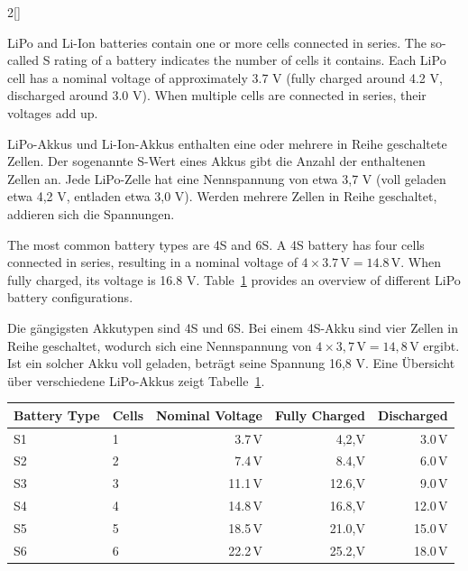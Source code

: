 \begin{paracol}{2}[]
\colende

\renewcommand{\deutschertitel}{Anzahl der Zellen (S4/S6)}
\renewcommand{\englischertitel}{Number of Cells (S4/S6)}
\makrounterabschnitt
\label{AbschnittSWertAkkusZellen}

LiPo and Li-Ion batteries contain one or more cells connected in series. The so-called S rating of a battery indicates the number of cells it contains. Each LiPo cell has a nominal voltage of approximately 3.7 V (fully charged around 4.2 V, discharged around 3.0 V). When multiple cells are connected in series, their voltages add up.

\colger

LiPo-Akkus und Li-Ion-Akkus enthalten eine oder mehrere in Reihe geschaltete Zellen. Der sogenannte S-Wert eines Akkus gibt die Anzahl der enthaltenen Zellen an. Jede LiPo-Zelle hat eine Nennspannung von etwa 3,7 V (voll geladen etwa 4,2 V, entladen etwa 3,0 V). Werden mehrere Zellen in Reihe geschaltet, addieren sich die Spannungen.

\coleng

The most common battery types are 4S and 6S. A 4S battery has four cells connected in series, resulting in a nominal voltage of \(4 \times 3.7\,\text{V} = 14.8\,\text{V}\). When fully charged, its voltage is 16.8 V. Table~\ref{TabelleAkkus} provides an overview of different LiPo battery configurations.

\colger

Die gängigsten Akkutypen sind 4S und 6S. Bei einem 4S-Akku sind vier Zellen in Reihe geschaltet, wodurch sich eine Nennspannung von \(4 \times 3,7\,\text{V} = 14,8\,\text{V}\) ergibt. Ist ein solcher Akku voll geladen, beträgt seine Spannung 16,8 V. Eine Übersicht über verschiedene LiPo-Akkus zeigt Tabelle~\ref{TabelleAkkus}.

\colende

\begin{table}[htb!]
\centering
{}
\label{TabelleAkkus}
\begin{tabularx}{\textwidth}{X@{\hskip 8mm}X@{\hskip 8mm}r@{\hskip 8mm}r@{\hskip 8mm}r}
\toprule
Battery Type  & Cells & Nominal Voltage  & Fully Charged & Discharged   \\
\midrule
S1            & 1     & 3.7\,V           & 4,2,V        & 3.0\,V         \\
S2            & 2     & 7.4\,V           & 8.4,V        & 6.0\,V         \\
S3            & 3     & 11.1\,V          & 12.6,V       & 9.0\,V         \\
S4            & 4     & 14.8\,V          & 16.8,V       & 12.0\,V        \\
S5            & 5     & 18.5\,V          & 21.0,V       & 15.0\,V        \\
S6            & 6     & 22.2\,V          & 25.2,V       & 18.0\,V        \\
\bottomrule
\end{tabularx}
\end{table}
\FloatBarrier


\end{paracol}
